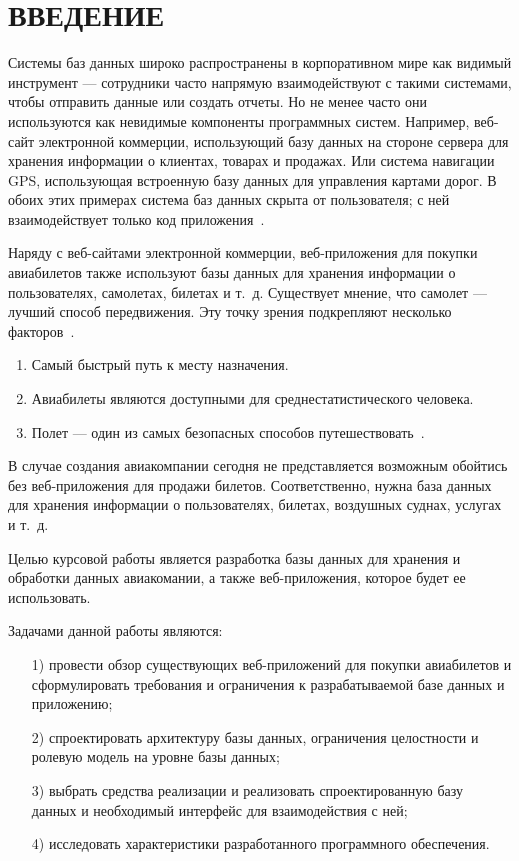 \documentclass{bmstu}
\begin{document}
{\centering \chapter*{ВВЕДЕНИЕ}}

Системы баз данных широко распространены в корпоративном мире как видимый инструмент --- сотрудники часто напрямую взаимодействуют с такими системами, чтобы отправить данные или создать отчеты. 
Но не менее часто они используются как невидимые компоненты программных систем. 
Например, веб-сайт электронной коммерции, использующий базу данных на стороне сервера для хранения информации о клиентах, товарах и продажах. 
Или система навигации GPS, использующая встроенную базу данных для управления картами дорог. 
В обоих этих примерах система баз данных скрыта от пользователя; с ней взаимодействует только код приложения~\cite{Sciore2020}.

Наряду с веб-сайтами электронной коммерции, веб-приложения для покупки авиабилетов также используют базы данных для хранения информации о пользователях, самолетах, билетах и т.~д. 
Существует мнение, что самолет --- лучший способ передвижения. 
Эту точку зрения подкрепляют несколько факторов~\cite{Ataturk2021}.
\begin{enumerate}
\item Самый быстрый путь к месту назначения.
\item Авиабилеты являются доступными для среднестатистического человека.
\item Полет --- один из самых безопасных способов путешествовать~\cite{Ataturk2021}.
\end{enumerate}

В случае создания авиакомпании сегодня не представляется возможным обойтись без веб-приложения для продажи билетов. 
Соответственно, нужна база данных для хранения информации о пользователях, билетах, воздушных суднах, услугах и т.~д.

Целью курсовой работы является разработка базы данных для хранения и обработки данных авиакомании, а также веб-приложения, которое будет ее использовать.

Задачами данной работы являются:
\begin{enumerate}
\item[1)] провести обзор существующих веб-приложений для покупки авиабилетов и сформулировать требования и ограничения к разрабатываемой базе данных и приложению;
\item[2)] спроектировать архитектуру базы данных, ограничения целостности и ролевую модель на уровне базы данных;
\item[3)] выбрать средства реализации и реализовать спроектированную базу данных и необходимый интерфейс для взаимодействия с ней;
\item[4)] исследовать характеристики разработанного программного обеспечения.
\end{enumerate}
\end{document}

